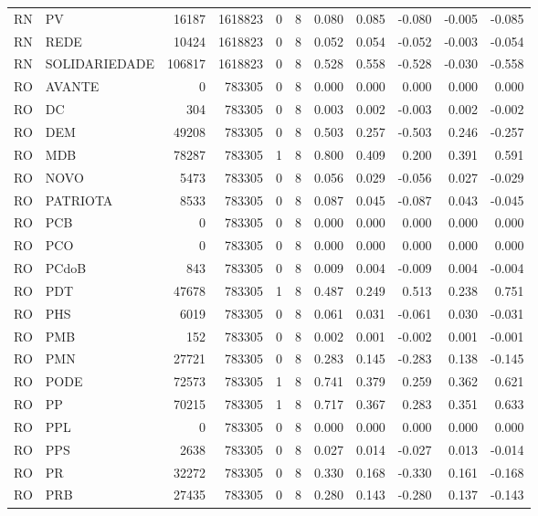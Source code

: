 \begin{landscape}
\begin{longtable}{llrrrrrrrrr}
RN & PV & 16187 & 1618823 & 0 & 8 & 0.080 & 0.085 & -0.080 & -0.005 & -0.085 \\
RN & REDE & 10424 & 1618823 & 0 & 8 & 0.052 & 0.054 & -0.052 & -0.003 & -0.054 \\
RN & SOLIDARIEDADE & 106817 & 1618823 & 0 & 8 & 0.528 & 0.558 & -0.528 & -0.030 & -0.558 \\
RO & AVANTE & 0 & 783305 & 0 & 8 & 0.000 & 0.000 & 0.000 & 0.000 & 0.000 \\
RO & DC & 304 & 783305 & 0 & 8 & 0.003 & 0.002 & -0.003 & 0.002 & -0.002 \\
RO & DEM & 49208 & 783305 & 0 & 8 & 0.503 & 0.257 & -0.503 & 0.246 & -0.257 \\
RO & MDB & 78287 & 783305 & 1 & 8 & 0.800 & 0.409 & 0.200 & 0.391 & 0.591 \\
RO & NOVO & 5473 & 783305 & 0 & 8 & 0.056 & 0.029 & -0.056 & 0.027 & -0.029 \\
RO & PATRIOTA & 8533 & 783305 & 0 & 8 & 0.087 & 0.045 & -0.087 & 0.043 & -0.045 \\
RO & PCB & 0 & 783305 & 0 & 8 & 0.000 & 0.000 & 0.000 & 0.000 & 0.000 \\
RO & PCO & 0 & 783305 & 0 & 8 & 0.000 & 0.000 & 0.000 & 0.000 & 0.000 \\
RO & PCdoB & 843 & 783305 & 0 & 8 & 0.009 & 0.004 & -0.009 & 0.004 & -0.004 \\
RO & PDT & 47678 & 783305 & 1 & 8 & 0.487 & 0.249 & 0.513 & 0.238 & 0.751 \\
RO & PHS & 6019 & 783305 & 0 & 8 & 0.061 & 0.031 & -0.061 & 0.030 & -0.031 \\
RO & PMB & 152 & 783305 & 0 & 8 & 0.002 & 0.001 & -0.002 & 0.001 & -0.001 \\
RO & PMN & 27721 & 783305 & 0 & 8 & 0.283 & 0.145 & -0.283 & 0.138 & -0.145 \\
RO & PODE & 72573 & 783305 & 1 & 8 & 0.741 & 0.379 & 0.259 & 0.362 & 0.621 \\
RO & PP & 70215 & 783305 & 1 & 8 & 0.717 & 0.367 & 0.283 & 0.351 & 0.633 \\
RO & PPL & 0 & 783305 & 0 & 8 & 0.000 & 0.000 & 0.000 & 0.000 & 0.000 \\
RO & PPS & 2638 & 783305 & 0 & 8 & 0.027 & 0.014 & -0.027 & 0.013 & -0.014 \\
RO & PR & 32272 & 783305 & 0 & 8 & 0.330 & 0.168 & -0.330 & 0.161 & -0.168 \\
RO & PRB & 27435 & 783305 & 0 & 8 & 0.280 & 0.143 & -0.280 & 0.137 & -0.143 \\

\end{longtable}
\end{landscape}
